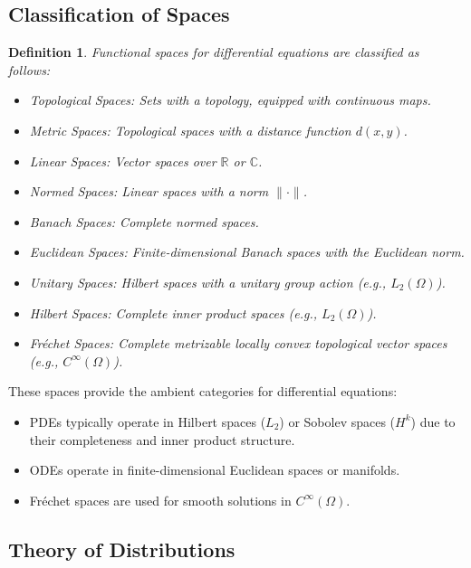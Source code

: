 \documentclass{article}
\theoremstyle{plain}
\newtheorem{definition}{Definition}[section]
\begin{document}
\subsection{Classification of Spaces}

\begin{definition}
Functional spaces for differential equations are classified as follows:
\begin{itemize}
    \item \emph{Topological Spaces}: Sets with a topology, equipped with continuous maps.
    \item \emph{Metric Spaces}: Topological spaces with a distance function \(d(x, y)\).
    \item \emph{Linear Spaces}: Vector spaces over \(\mathbb{R}\) or \(\mathbb{C}\).
    \item \emph{Normed Spaces}: Linear spaces with a norm \(\|\cdot\|\).
    \item \emph{Banach Spaces}: Complete normed spaces.
    \item \emph{Euclidean Spaces}: Finite-dimensional Banach spaces with the Euclidean norm.
    \item \emph{Unitary Spaces}: Hilbert spaces with a unitary group action (e.g., \(L_2(\Omega)\)).
    \item \emph{Hilbert Spaces}: Complete inner product spaces (e.g., \(L_2(\Omega)\)).
    \item \emph{Fréchet Spaces}: Complete metrizable locally convex topological vector spaces (e.g., \(C^\infty(\Omega)\)).
\end{itemize}
\end{definition}

These spaces provide the ambient categories for differential equations:
\begin{itemize}
    \item PDEs typically operate in Hilbert spaces (\(L_2\)) or Sobolev spaces (\(H^k\)) due to their completeness and inner product structure.
    \item ODEs operate in finite-dimensional Euclidean spaces or manifolds.
    \item Fréchet spaces are used for smooth solutions in \(C^\infty(\Omega)\).
\end{itemize}

\subsection{Theory of Distributions}
\end{document}
